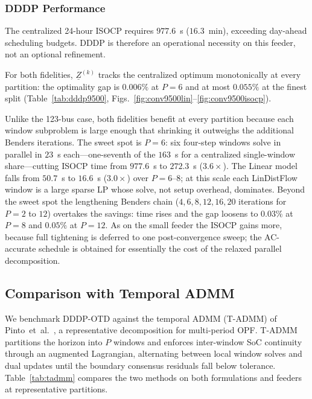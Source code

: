 \subsubsection{DDDP Performance}
\label{sssec:9500_dddp}

The centralized 24-hour ISOCP requires $977.6$~s ($16.3$~min), exceeding
day-ahead scheduling budgets. DDDP is therefore an operational necessity on this
feeder, not an optional refinement.

For both fidelities, $\underline{Z}^{(k)}$ tracks the centralized optimum
monotonically at every partition: the optimality gap is $0.006\%$ at $P\!=\!6$
and at most $0.055\%$ at the finest split (Table~\ref{tab:dddp9500},
Figs.~\ref{fig:conv9500lin}--\ref{fig:conv9500isocp}).

Unlike the 123-bus case, both fidelities benefit at every partition because each
window subproblem is large enough that shrinking it outweighs the additional
Benders iterations. The sweet spot is $P\!=\!6$: six four-step windows solve in
parallel in $23$~s each---one-seventh of the $163$~s for a centralized
single-window share---cutting ISOCP time from $977.6$~s to $272.3$~s
($3.6\times$). The Linear model falls from $50.7$~s to $16.6$~s ($3.0\times$)
over $P\!=\!6$--$8$; at this scale each LinDistFlow window is a large sparse LP
whose solve, not setup overhead, dominates. Beyond the sweet spot the lengthening
Benders chain ($4, 6, 8, 12, 16, 20$ iterations for $P\!=\!2$ to $12$) overtakes
the savings: time rises and the gap loosens to $0.03\%$ at $P\!=\!8$ and $0.05\%$
at $P\!=\!12$. As on the small feeder the ISOCP gains more, because full
tightening is deferred to one post-convergence sweep; the AC-accurate schedule is
obtained for essentially the cost of the relaxed parallel decomposition.

\subsection{Comparison with Temporal ADMM}
\label{ssec:tadmm}

We benchmark DDDP-OTD against the temporal ADMM (T-ADMM) of
Pinto~et~al.~\cite{PiBe20}, a representative decomposition for multi-period
OPF. T-ADMM partitions the horizon into $P$ windows and enforces inter-window
SoC continuity through an augmented Lagrangian, alternating between local
window solves and dual updates until the boundary consensus residuals fall
below tolerance. Table~\ref{tab:tadmm} compares the two methods on both
formulations and feeders at representative partitions.

